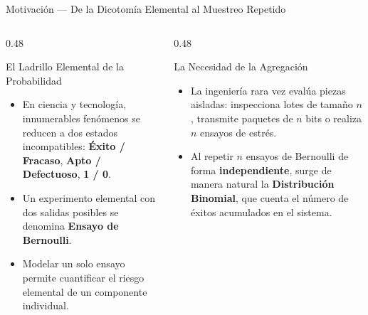 \documentclass[10pt, aspectratio=169]{beamer}
\begin{document}
\begin{frame}{Motivación — De la Dicotomía Elemental al Muestreo Repetido}
  \begin{columns}[T]
    \begin{column}{0.48\textwidth}
      \begin{block}{El Ladrillo Elemental de la Probabilidad}
        \footnotesize
        \begin{itemize}\itemsep=0.1cm
          \item En ciencia y tecnología, innumerables fenómenos se reducen a dos estados incompatibles: \textbf{Éxito / Fracaso}, \textbf{Apto / Defectuoso}, \textbf{1 / 0}.
          \item Un experimento elemental con dos salidas posibles se denomina \textbf{Ensayo de Bernoulli}.
          \item Modelar un solo ensayo permite cuantificar el riesgo elemental de un componente individual.
        \end{itemize}
      \end{block}
    \end{column}
    \begin{column}{0.48\textwidth}
      \pause
      \begin{alertblock}{La Necesidad de la Agregación}
        \footnotesize
        \begin{itemize}\itemsep=0.1cm
          \item La ingeniería rara vez evalúa piezas aisladas: inspecciona lotes de tamaño $n$, transmite paquetes de $n$ bits o realiza $n$ ensayos de estrés.
          \item Al repetir $n$ ensayos de Bernoulli de forma \textbf{independiente}, surge de manera natural la \textbf{Distribución Binomial}, que cuenta el número de éxitos acumulados en el sistema.
        \end{itemize}
      \end{alertblock}
    \end{column}
  \end{columns}
\end{frame}
\end{document}

